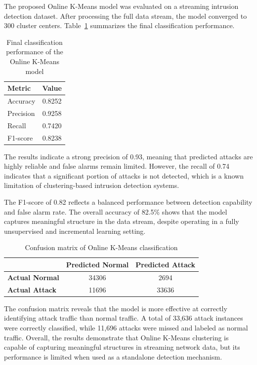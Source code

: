 \nextparagraph
The proposed Online K-Means model was evaluated on a streaming intrusion detection dataset. After processing the full data stream, the model converged to 300 cluster centers. Table~\ref{tab:metrics} summarizes the final classification performance.

\begin{table}[h]
\centering
\begin{tabular}{lc}
\hline
\textbf{Metric} & \textbf{Value} \\
\hline
Accuracy  & 0.8252 \\
Precision & 0.9258 \\
Recall    & 0.7420 \\
F1-score  & 0.8238 \\
\hline
\end{tabular}
\caption{Final classification performance of the Online K-Means model}
\label{tab:metrics}
\end{table}

\nextparagraph
The results indicate a strong precision of 0.93, meaning that predicted attacks are highly reliable and false alarms remain limited. However, the recall of 0.74 indicates that a significant portion of attacks is not detected, which is a known limitation of clustering-based intrusion detection systems.

\nextparagraph
The F1-score of 0.82 reflects a balanced performance between detection capability and false alarm rate. The overall accuracy of 82.5\% shows that the model captures meaningful structure in the data stream, despite operating in a fully unsupervised and incremental learning setting.

\begin{table}[h]
\centering
\begin{tabular}{lcc}
\hline
 & \textbf{Predicted Normal} & \textbf{Predicted Attack} \\
\hline
\textbf{Actual Normal}  & 34306 & 2694 \\
\textbf{Actual Attack}  & 11696 & 33636 \\
\hline
\end{tabular}
\caption{Confusion matrix of Online K-Means classification}
\label{tab:confusion}
\end{table}

\nextparagraph
The confusion matrix reveals that the model is more effective at correctly identifying attack traffic than normal traffic. A total of 33,636 attack instances were correctly classified, while 11,696 attacks were missed and labeled as normal traffic. Overall, the results demonstrate that Online K-Means clustering is capable of capturing meaningful structures in streaming network data, but its performance is limited when used as a standalone detection mechanism.